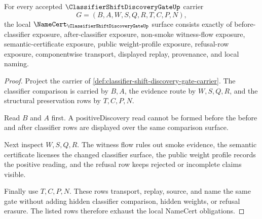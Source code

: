 \begin{theorem}
\label{thm:classifier-shift-discovery-gate-namecert-obligations}
For every accepted $\ClassifierShiftDiscoveryGateUp$ carrier
$$
G=(B,A,W,S,Q,R,T,C,P,N),
$$
the local $\NameCert_{\ClassifierShiftDiscoveryGateUp}$ surface consists exactly of before-classifier exposure, after-classifier exposure, non-smoke witness-flow exposure, semantic-certificate exposure, public weight-profile exposure, refusal-row exposure, componentwise transport, displayed replay, provenance, and local naming.
\end{theorem}
\begin{proof}
Project the carrier of \autoref{def:classifier-shift-discovery-gate-carrier}. The classifier comparison is carried by $B,A$, the evidence route by $W,S,Q,R$, and the structural preservation rows by $T,C,P,N$.

Read $B$ and $A$ first. A positiveDiscovery read cannot be formed before the before and after classifier rows are displayed over the same comparison surface.

Next inspect $W,S,Q,R$. The witness flow rules out smoke evidence, the semantic certificate licenses the changed classifier surface, the public weight profile records the positive reading, and the refusal row keeps rejected or incomplete claims visible.

Finally use $T,C,P,N$. These rows transport, replay, source, and name the same gate without adding hidden classifier comparison, hidden weights, or refusal erasure. The listed rows therefore exhaust the local NameCert obligations.
\end{proof}

